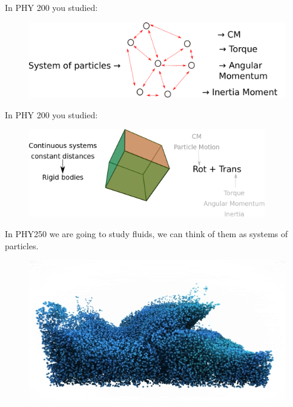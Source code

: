 \documentclass[]{beamer}
\begin{document}
\begin{frame}

  In PHY 200 you studied:

  \begin{figure}[h!]
    \begin{center}
      \includegraphics[height=1.in]{images/rev2.png}
    \end{center}
  \end{figure}


\end{frame}

\begin{frame}

  In PHY 200 you studied:

  \begin{figure}[h!]
    \begin{center}
      \includegraphics[height=1.5in]{images/rev3.png}
    \end{center}
  \end{figure}


\end{frame}


\begin{frame}

In PHY250 we are going to study fluids, we can think of them as systems of particles.

  \begin{figure}[h!]
    \begin{center}
      \includegraphics[height=2.in]{images/particles_fluid.jpg}
    \end{center}
  \end{figure}
   


\end{frame}
\end{document}
